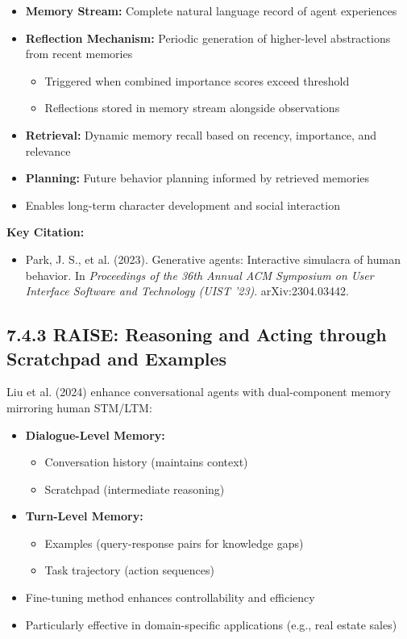 \documentclass[11pt,letterpaper]{article}
\begin{document}
\begin{itemize}[leftmargin=*]
    \item \textbf{Memory Stream:} Complete natural language record of agent experiences
    \item \textbf{Reflection Mechanism:} Periodic generation of higher-level abstractions from recent memories
    \begin{itemize}
        \item Triggered when combined importance scores exceed threshold
        \item Reflections stored in memory stream alongside observations
    \end{itemize}
    \item \textbf{Retrieval:} Dynamic memory recall based on recency, importance, and relevance
    \item \textbf{Planning:} Future behavior planning informed by retrieved memories
    \item Enables long-term character development and social interaction
\end{itemize}

\textbf{Key Citation:}
\begin{itemize}[leftmargin=*]
    \item Park, J. S., et al. (2023). Generative agents: Interactive simulacra of human behavior. In \textit{Proceedings of the 36th Annual ACM Symposium on User Interface Software and Technology (UIST '23)}. arXiv:2304.03442.
\end{itemize}

\subsection{7.4.3 RAISE: Reasoning and Acting through Scratchpad and Examples}

Liu et al. (2024) enhance conversational agents with dual-component memory mirroring human STM/LTM:

\begin{itemize}[leftmargin=*]
    \item \textbf{Dialogue-Level Memory:}
    \begin{itemize}
        \item Conversation history (maintains context)
        \item Scratchpad (intermediate reasoning)
    \end{itemize}
    \item \textbf{Turn-Level Memory:}
    \begin{itemize}
        \item Examples (query-response pairs for knowledge gaps)
        \item Task trajectory (action sequences)
    \end{itemize}
    \item Fine-tuning method enhances controllability and efficiency
    \item Particularly effective in domain-specific applications (e.g., real estate sales)
\end{itemize}
\end{document}
